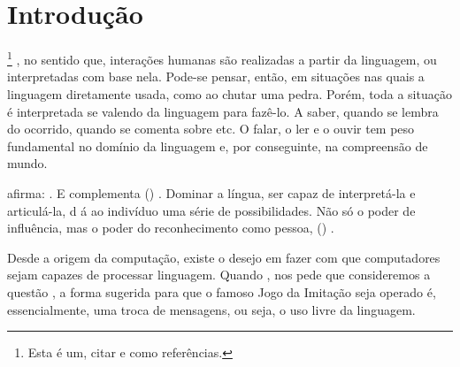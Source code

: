 \chapter{Introdução}
\label{cap:introducao}
 \cite{oliveira2019servico}
\footnote{Esta é um,  citar  e  como referências.}
, no sentido que, interações humanas são realizadas a partir da linguagem, ou interpretadas com base nela. 
Pode-se pensar, então, em situações nas quais a linguagem  diretamente usada, como ao chutar uma pedra.
Porém, toda a situação é interpretada se valendo da linguagem para fazê-lo. 
A saber, quando se lembra do ocorrido, quando se comenta sobre etc. O falar, o ler e o ouvir tem peso fundamental no domínio da linguagem e, por conseguinte, na compreensão de mundo.

 afirma: . E complementa (\textit{}) . Dominar a língua, ser capaz de interpretá-la e articulá-la, d
á ao indivíduo uma série de possibilidades. Não só o poder de influência, mas o poder do reconhecimento como pessoa, (\textit{}) .

Desde a origem da computação, existe o desejo em fazer com que computadores sejam capazes de processar linguagem.
Quando , nos pede que consideremos a questão ,
a forma sugerida para que o famoso Jogo da Imitação seja operado é, essencialmente, uma troca de mensagens, ou seja, o uso livre da linguagem. 

